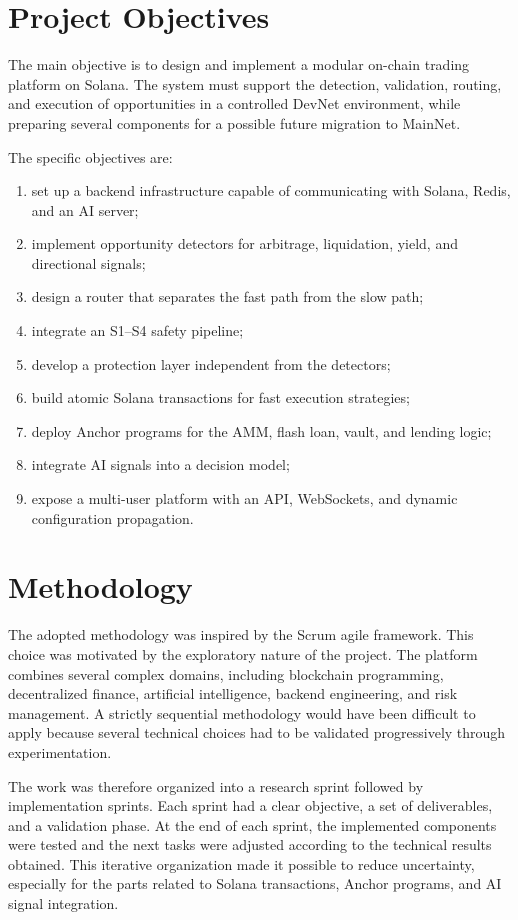\documentclass[12pt,a4paper]{report}
\begin{document}
\section{Project Objectives}

The main objective is to design and implement a modular on-chain trading platform on Solana. The system must support the detection, validation, routing, and execution of opportunities in a controlled DevNet environment, while preparing several components for a possible future migration to MainNet.

The specific objectives are:
\begin{enumerate}
    \item set up a backend infrastructure capable of communicating with Solana, Redis, and an AI server;
    \item implement opportunity detectors for arbitrage, liquidation, yield, and directional signals;
    \item design a router that separates the fast path from the slow path;
    \item integrate an S1--S4 safety pipeline;
    \item develop a protection layer independent from the detectors;
    \item build atomic Solana transactions for fast execution strategies;
    \item deploy Anchor programs for the AMM, flash loan, vault, and lending logic;
    \item integrate AI signals into a decision model;
    \item expose a multi-user platform with an API, WebSockets, and dynamic configuration propagation.
\end{enumerate}

\section{Methodology}

The adopted methodology was inspired by the Scrum agile framework. This choice was motivated by the exploratory nature of the project. The platform combines several complex domains, including blockchain programming, decentralized finance, artificial intelligence, backend engineering, and risk management. A strictly sequential methodology would have been difficult to apply because several technical choices had to be validated progressively through experimentation.

The work was therefore organized into a research sprint followed by implementation sprints. Each sprint had a clear objective, a set of deliverables, and a validation phase. At the end of each sprint, the implemented components were tested and the next tasks were adjusted according to the technical results obtained. This iterative organization made it possible to reduce uncertainty, especially for the parts related to Solana transactions, Anchor programs, and AI signal integration.
\end{document}
